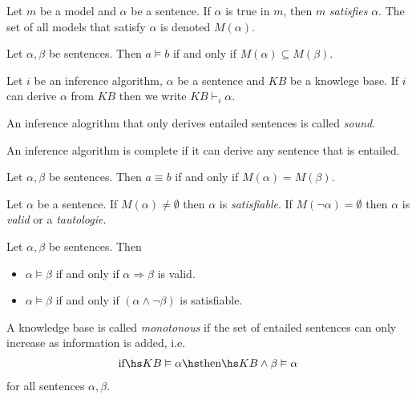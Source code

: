 \documentclass{article}
\begin{document}
\begin{definition}
    Let $m$ be a model and $\alpha$ be a sentence. If $\alpha$ is true in $m$, then
    $m$ \emph{satisfies} $\alpha$. The set of all models that satisfy $\alpha$ is
    denoted $M(\alpha)$.
\end{definition}

\begin{definition}
    Let $\alpha,\beta$ be sentences. Then $a\vDash b$ if and only if $M(\alpha)\subseteq M(\beta)$.
\end{definition}

\begin{definition}
    Let $i$ be an inference algorithm, $\alpha$ be a sentence and $KB$ be a knowlege base.
    If $i$ can derive $\alpha$ from $KB$ then we write $KB\vdash_i \alpha$.
\end{definition}

\begin{definition}
    An inference alogrithm that only derives entailed sentences is called \emph{sound}.
\end{definition}

\begin{definition}
    An inference algorithm is complete if it can derive any sentence that is entailed.
\end{definition}

\begin{definition}
    Let $\alpha,\beta$ be sentences. Then $a\equiv b$ if and only if $M(\alpha)=M(\beta)$.
\end{definition}

\begin{definition}
    Let $\alpha$ be a sentence. If $M(\alpha)\not=\emptyset$ then $\alpha$ is \emph{satisfiable}.
    If $M(\neg\alpha)=\emptyset$ then $\alpha$ is \emph{valid} or a \emph{tautologie}.
\end{definition}

\begin{lemma}
    Let $\alpha,\beta$ be sentences. Then
    \begin{itemize}
        \item $\alpha\vDash\beta$ if and only if $\alpha\Rightarrow\beta$ is valid.
        \item $\alpha\vDash\beta$ if and only if $(\alpha\wedge\neg\beta)$ is satisfiable.
    \end{itemize}
\end{lemma}

\begin{definition}
    A knowledge base is called \emph{monotonous} if the set of entailed sentences can
    only increase as information is added, i.e.
    \begin{align*}
        \text{if}\hs KB \vDash \alpha \hs\text{then}\hs KB\wedge \beta \vDash \alpha
    \end{align*}
    for all sentences $\alpha,\beta$.
\end{definition}
\end{document}
